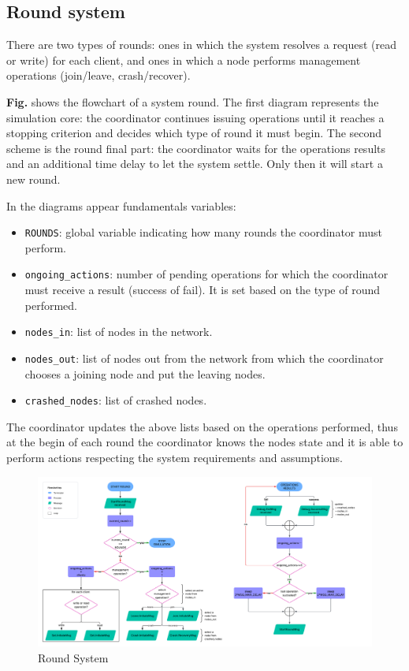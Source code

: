 \documentclass{article}
\begin{document}
\subsection{Round system}
There are two types of rounds: ones in which the system resolves a request (read
or write) for each client, and ones in which a node performs management 
operations (join/leave, crash/recover).

\textbf{Fig.} shows the flowchart of a system round. The first 
diagram represents the simulation core: the coordinator continues 
issuing operations until it reaches a stopping criterion 
and decides which type of round it must begin. The second scheme is the round 
final part: the coordinator waits for the operations results and an additional 
time delay to let the system settle. Only then it will start a new round.

In the diagrams appear fundamentals variables:
\begin{itemize}
    \item \texttt{ROUNDS}: global variable indicating how many rounds the 
    coordinator must perform.
    \item \texttt{ongoing\_actions}: number of pending operations for which the 
    coordinator must receive a result (success of fail). It is set based on the 
    type of round performed.
    \item \texttt{nodes\_in}: list of nodes in the network.
    \item \texttt{nodes\_out}: list of nodes out from the network from which the 
    coordinator chooses a joining node and put the leaving nodes.
    \item \texttt{crashed\_nodes}: list of crashed nodes.
\end{itemize}

The coordinator updates the above lists based on the operations performed, thus 
at the begin of each round the coordinator knows the nodes state and it is 
able to perform actions respecting the system requirements and assumptions.

\begin{figure}[ht!]
    \centering
    \includegraphics[width=1\linewidth]{images/round_sys.png}
    \caption{Round System}
    \label{fig:round_sys}
\end{figure}
\end{document}
